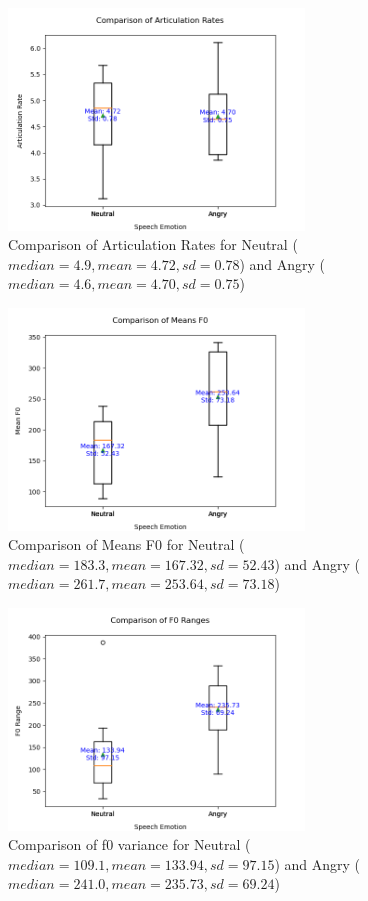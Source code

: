 \documentclass{../labbook}
\begin{document}
\begin{solution}
\begin{figure}[!h]
    \centering
    \includegraphics[width=0.7\textwidth]{2ndM.png}
    \caption{Comparison of Articulation Rates for Neutral ($median=4.9, mean=4.72, sd=0.78$) and Angry ($median=4.6, mean=4.70, sd=0.75$)}
\end{figure}

\begin{figure}[!h]
    \centering
    \includegraphics[width=0.7\textwidth]{3rdM.png}
    \caption{Comparison of Means F0 for Neutral ($median=183.3, mean=167.32, sd=52.43$) and Angry ($median=261.7, mean=253.64, sd=73.18$)}
\end{figure}

\begin{figure}[!h]
    \centering
    \includegraphics[width=0.7\textwidth]{4thM.png}
    \caption{Comparison of f0 variance for Neutral ($median=109.1, mean=133.94, sd=97.15$) and Angry ($median=241.0, mean=235.73, sd=69.24$)}
\end{figure}


\end{solution}
\end{document}
